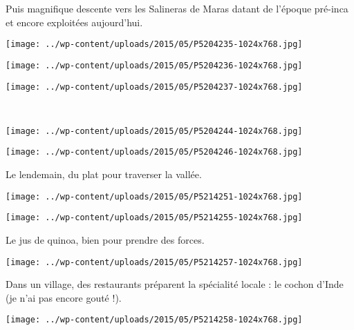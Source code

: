 Puis magnifique descente vers les Salineras de Maras datant de l'époque pré-inca et encore exploitées aujourd'hui. 
\begin{center} \texttt{[image: ../wp-content/uploads/2015/05/P5204235-1024x768.jpg]} \end{center}
\begin{center} \texttt{[image: ../wp-content/uploads/2015/05/P5204236-1024x768.jpg]} \end{center}
\vfill
\begin{center} \texttt{[image: ../wp-content/uploads/2015/05/P5204237-1024x768.jpg]} \end{center}
\vspace{-\topsep}
\vspace{-0.75mm}
\pagebreak
~
\begin{center} \texttt{[image: ../wp-content/uploads/2015/05/P5204244-1024x768.jpg]} \end{center}
\begin{center} \texttt{[image: ../wp-content/uploads/2015/05/P5204246-1024x768.jpg]} \end{center}
\vspace{-\topsep}
\vspace{-3.25mm}
\pagebreak

Le lendemain, du plat pour traverser la vallée. 
\begin{center} \texttt{[image: ../wp-content/uploads/2015/05/P5214251-1024x768.jpg]} \end{center}
\begin{center} \texttt{[image: ../wp-content/uploads/2015/05/P5214255-1024x768.jpg]} \end{center}
\vspace{-\topsep}
\vspace{-3.25mm}
\pagebreak

Le jus de quinoa, bien pour prendre des forces. 
\begin{center} \texttt{[image: ../wp-content/uploads/2015/05/P5214257-1024x768.jpg]} \end{center}

Dans un village, des restaurants préparent la spécialité locale : le cochon d'Inde (je n'ai pas encore gouté !).
\begin{center} \texttt{[image: ../wp-content/uploads/2015/05/P5214258-1024x768.jpg]} \end{center}
\vspace{-\topsep}
\pagebreak

